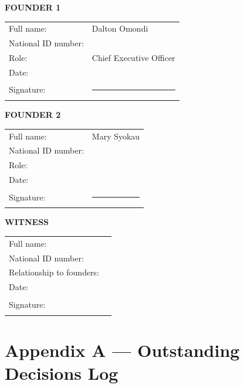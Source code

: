 \documentclass[12pt,a4paper]{article}
\newcommand{\blank}[1][5.5cm]{\underline{\hspace{#1}}}
\begin{document}
\vspace{1.5em}

\noindent\textbf{FOUNDER 1}\\[1em]
\begin{tabular}{@{}l l@{}}
  Full name:              & Dalton Omondi \\[1em]
  National ID number:     & \blank[6cm] \\[1em]
  Role:                   & Chief Executive Officer \\[1em]
  Date:                   & \blank[6cm] \\[1.5em]
  Signature:              & \rule{7cm}{0.4pt} \\
\end{tabular}

\vspace{2em}

\noindent\textbf{FOUNDER 2}\\[1em]
\begin{tabular}{@{}l l@{}}
  Full name:              & Mary Syokau \\[1em]
  National ID number:     & \blank[6cm] \\[1em]
  Role:                   & \blank[6cm] \\[1em]
  Date:                   & \blank[6cm] \\[1.5em]
  Signature:              & \rule{7cm}{0.4pt} \\
\end{tabular}

\vspace{2em}

\noindent\textbf{WITNESS}\\[1em]
\begin{tabular}{@{}l l@{}}
  Full name:                        & \blank[7cm] \\[1em]
  National ID number:               & \blank[7cm] \\[1em]
  Relationship to founders:         & \blank[7cm] \\[1em]
  Date:                             & \blank[7cm] \\[1.5em]
  Signature:                        & \rule{7cm}{0.4pt} \\
\end{tabular}

\newpage
\appendix
\section*{Appendix A --- Outstanding Decisions Log}
\end{document}
